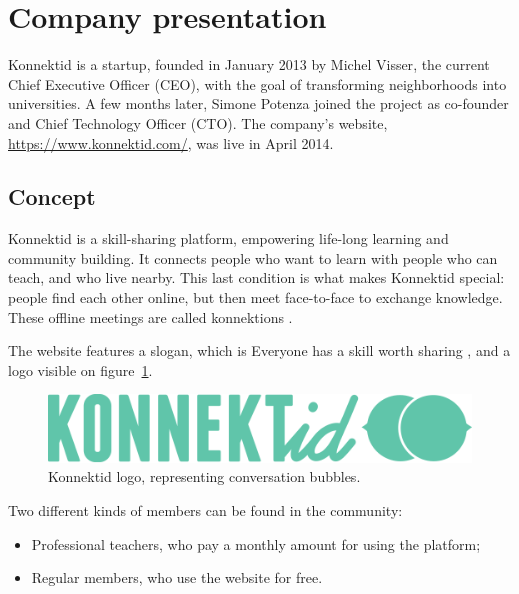 \section{Company presentation}
\label{sec:company}

Konnektid is a startup, founded in January 2013 by Michel {\sc Visser}, the current Chief Executive Officer (CEO),
with the goal of transforming neighborhoods into universities. A few months later, Simone {\sc Potenza} joined the project
as co-founder and Chief Technology Officer (CTO). The company's website, \url{https://www.konnektid.com/}, was live in April 2014.

\subsection{Concept}
\label{ssec:concept}

Konnektid is a skill-sharing platform, empowering life-long learning and community building. It connects people who want to learn with people who can teach, and who live nearby.
This last condition is what makes Konnektid special: people find each other online, but then meet face-to-face to exchange knowledge.
These offline meetings are called \guillemotleft{} konnektions \guillemotright{}.

The website features a slogan, which is \guillemotleft{} Everyone has a skill worth sharing \guillemotright{},
and a logo visible on {\sc figure}~\ref{fig:logoKonnektid}.
\vspace{1cm}

\begin{figure}[h]
    \centering
    \includegraphics[scale=0.6]{figure/logo_konnektid.png}
    \caption{Konnektid logo, representing conversation bubbles.}
    \label{fig:logoKonnektid}
\end{figure}

Two different kinds of members can be found in the community:

\begin{itemize}[noitemsep]
    \item Professional teachers, who pay a monthly amount for using the platform;
    \item Regular members, who use the website for free.
\end{itemize}

